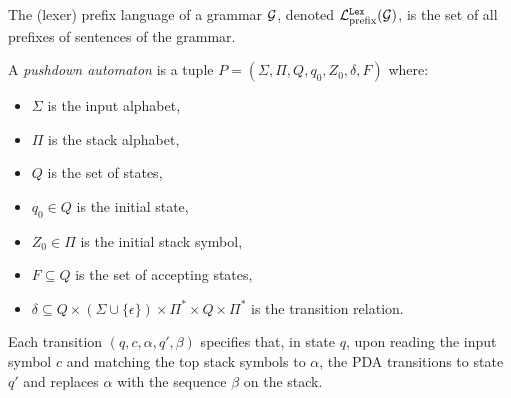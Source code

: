 

\begin{definition}
    \label{def:CFGPrefixLanguage}
    The (lexer) prefix language of a grammar $\mathcal{G}$, denoted $\mathcal{L}_{\mathrm{prefix}}^{\mathtt{Lex}}(\mathcal{G})$, is the set of all prefixes of sentences of the grammar.
\end{definition}

\begin{definition}
    \label{def:PDA}
    A \emph{pushdown automaton} is a tuple $P = (\Sigma, \Pi, Q, q_0, Z_0, \delta, F)$ where:
    \begin{itemize}
        \item $\Sigma$ is the input alphabet,
        \item $\Pi$ is the stack alphabet,
        \item $Q$ is the set of states,
        \item $q_0 \in Q$ is the initial state,
        \item $Z_0 \in \Pi$ is the initial stack symbol,
        \item $F \subseteq Q$ is the set of accepting states,
        \item $\delta \subseteq Q \times (\Sigma \cup \{\epsilon\}) \times \Pi^* \times Q \times \Pi^*$ is the transition relation.
    \end{itemize}

    Each transition $(q, c, \alpha, q', \beta)$ specifies that, in state $q$, upon reading the input symbol $c$ and matching the top stack symbols to $\alpha$, the PDA transitions to state $q'$ and replaces $\alpha$ with the sequence $\beta$ on the stack.
\end{definition}
